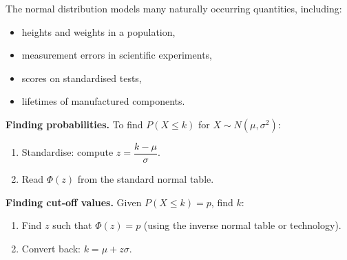 
The normal distribution models many naturally occurring quantities, including:
\begin{itemize}[leftmargin=*]
  \item heights and weights in a population,
  \item measurement errors in scientific experiments,
  \item scores on standardised tests,
  \item lifetimes of manufactured components.
\end{itemize}

\textbf{Finding probabilities.} To find $P(X \leq k)$ for $X \sim N(\mu, \sigma^2)$:
\begin{enumerate}[leftmargin=*]
  \item Standardise: compute $z = \dfrac{k - \mu}{\sigma}$.
  \item Read $\Phi(z)$ from the standard normal table.
\end{enumerate}

\textbf{Finding cut-off values.} Given $P(X \leq k) = p$, find $k$:
\begin{enumerate}[leftmargin=*]
  \item Find $z$ such that $\Phi(z) = p$ (using the inverse normal table or technology).
  \item Convert back: $k = \mu + z\sigma$.
\end{enumerate}

